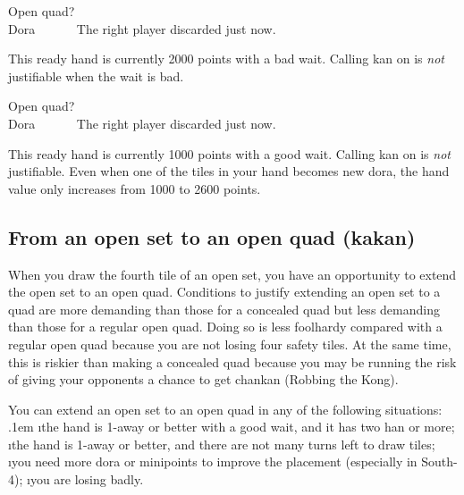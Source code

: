 \bigskip
\begin{itembox}[r]{Open quad?}
\bp
{}\zhong\zhong\zhong~~~\\
\hfill\footnotesize{{\jap Dora}~~~~~~}
\ep
\vspace{-15pt}The right player discarded {\LARGE\zhong} just now.
\end{itembox}

\bigskip
This ready hand is currently 2000 points with a bad wait. Calling {\jap kan} on {\LARGE\zhong} is \emph{not} justifiable when the wait is bad.

\bigskip
\begin{itembox}[r]{Open quad?}
\bp
{}\zhong\zhong\zhong~~~\\
\hfill\footnotesize{{\jap Dora}~~~~~~}
\ep
\vspace{-15pt}The right player discarded {\LARGE\zhong} just now.
\end{itembox}

\bigskip
This ready hand is currently 1000 points with a good wait. Calling {\jap kan} on {\LARGE\zhong} is \emph{not} justifiable. Even when one of the tiles in your hand becomes new {\jap dora}, the hand value only increases from 1000 to 2600 points. 

\bigskip
\subsection{From an open set to an open quad ({\jap kakan})}
When you draw the fourth tile of an open set, you have an opportunity to extend the open set to an open quad. Conditions to justify extending an open set to a quad are more demanding than those for a concealed quad but less demanding than those for a regular open quad. 
Doing so is less foolhardy compared with a regular open quad because you are not losing four safety tiles. At the same time, this is riskier than making a concealed quad because you may be running the risk of giving your opponents a chance to get {\jap chankan} (Robbing the Kong). 

\bigskip
You can extend an open set to an open quad in any of the following situations:
\bi \itemsep.1em
\i the hand is 1-away or better with a good wait, and it has two {\jap han} or more;
\i the hand is 1-away or better, and there are not many turns left to draw tiles;
\i you need more {\jap dora} or minipoints to improve the placement (especially in South-4);
\i you are losing badly.
\ei

